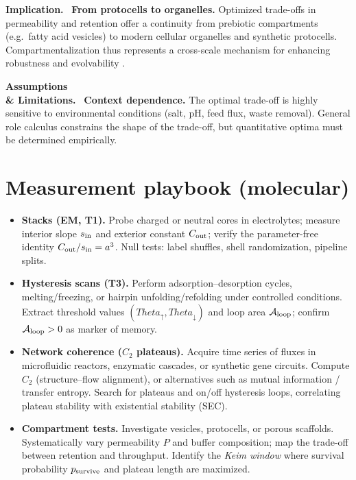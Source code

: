 \documentclass[12pt,a4paper,oneside]{scrreprt}
\def\Theta{Theta}%
\newenvironment{implication}{\par\vspace{0.5em}\noindent\textbf{Implication.}\ }{\par\vspace{0.5em}}
\newenvironment{limitation}{\par\vspace{0.5em}\noindent\textbf{Assumptions \\ \& Limitations.}\ }{\par\vspace{0.5em}}
\begin{document}
\begin{implication}
\textbf{From protocells to organelles.} 
Optimized trade-offs in permeability and retention 
offer a continuity from prebiotic compartments 
(e.g.\ fatty acid vesicles) 
to modern cellular organelles and synthetic protocells. 
Compartmentalization thus represents a cross-scale 
mechanism for enhancing robustness and evolvability 
\citep{Szostak2001Protocells,Luisi2006OriginLife}. 
\end{implication}

\begin{limitation}
\textbf{Context dependence.} 
The optimal trade-off is highly sensitive to 
environmental conditions (salt, pH, feed flux, waste removal). 
General role calculus constrains the shape of the trade-off, 
but quantitative optima must be determined empirically. 
\end{limitation}

\section{Measurement playbook (molecular)}\label{sec:molecular-playbook}

\begin{itemize}
  \item \textbf{Stacks (EM, T1).} 
  Probe charged or neutral cores in electrolytes; 
  measure interior slope $s_{\rm in}$ and exterior constant $C_{\rm out}$; 
  verify the parameter-free identity $C_{\rm out}/s_{\rm in}=a^3$. 
  Null tests: label shuffles, shell randomization, pipeline splits.

  \item \textbf{Hysteresis scans (T3).} 
  Perform adsorption--desorption cycles, melting/freezing, 
  or hairpin unfolding/refolding under controlled conditions. 
  Extract threshold values $(\Theta_\uparrow,\Theta_\downarrow)$ 
  and loop area $\mathcal A_{\rm loop}$; 
  confirm $\mathcal A_{\rm loop}>0$ as marker of memory. 

  \item \textbf{Network coherence ($C_2$ plateaus).} 
  Acquire time series of fluxes in microfluidic reactors, 
  enzymatic cascades, or synthetic gene circuits. 
  Compute $C_2$ (structure--flow alignment), 
  or alternatives such as mutual information / transfer entropy. 
  Search for plateaus and on/off hysteresis loops, 
  correlating plateau stability with existential stability (SEC).

  \item \textbf{Compartment tests.} 
  Investigate vesicles, protocells, or porous scaffolds. 
  Systematically vary permeability $P$ and buffer composition; 
  map the trade-off between retention and throughput. 
  Identify the \emph{Keim window} where 
  survival probability $p_{\rm survive}$ and plateau length 
  are maximized. 
\end{itemize}
\end{document}
